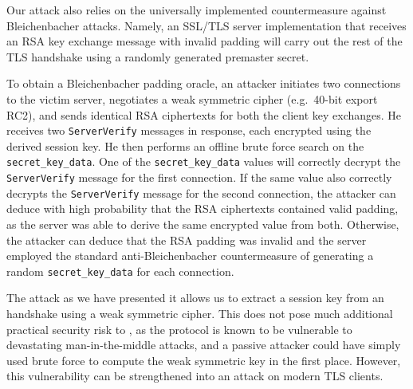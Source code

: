 Our attack also relies on the universally implemented countermeasure
against Bleichenbacher attacks.  Namely, an SSL/TLS server
implementation that receives an RSA key exchange message with invalid
padding will carry out the
rest of the TLS handshake using a randomly generated premaster secret.

To obtain a Bleichenbacher padding oracle, an attacker initiates
two \ssltwo connections to the victim server, negotiates a weak
symmetric cipher (e.g.~40-bit export RC2), and sends identical RSA
ciphertexts for both the client key exchanges.  He receives
two \texttt{ServerVerify} messages in response, each encrypted using
the derived session key.  He then performs an offline brute force
search on the \texttt{secret\_key\_data}. One of
the \texttt{secret\_key\_data} values will correctly decrypt
the \texttt{ServerVerify} message for the first connection. If the
same value also correctly decrypts the \texttt{ServerVerify} message
for the second connection, the attacker can deduce with high
probability that the RSA ciphertexts contained valid padding, as the
server was able to derive the same encrypted value from both.
Otherwise, the attacker can deduce that the RSA padding was invalid
and the server employed the standard anti-Bleichenbacher
countermeasure of generating a random \texttt{secret\_key\_data} for
each connection.

The attack as we have presented it allows us to extract a session key
from an \ssltwo handshake using a weak symmetric cipher.  This does
not pose much additional practical security risk to \ssltwo, as the
protocol is known to be vulnerable to devastating man-in-the-middle
attacks, and a passive attacker could have simply used brute force to
compute the weak symmetric key in the first place.  However, this
vulnerability can be strengthened into an attack on modern TLS
clients.



